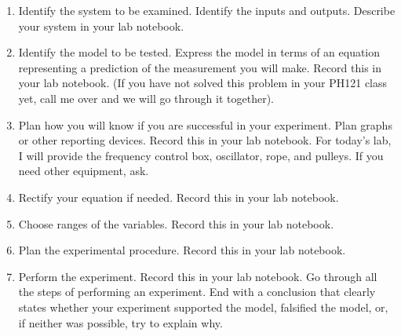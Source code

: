 \documentclass[twoside,11pt,ShortChapTitles]{BYUTextbook}
\begin{document}
\begin{enumerate}
\item Identify the system to be examined. Identify the inputs and
outputs. Describe your system in your lab notebook.

\item Identify the model to be tested. Express the model in terms of
an equation representing a prediction of the measurement you will make. Record
this in your lab notebook. (If you have not solved this problem in your PH121
class yet, call me over and we will go through it together).

\item Plan how you will know if you are successful in your experiment.
Plan graphs or other reporting devices. Record this in your lab notebook. For
today's lab, I will provide the frequency control box, oscillator, rope, and pulleys. If you need
other equipment, ask.

\item Rectify your equation if needed. Record this in your lab
notebook.

\item Choose ranges of the variables. Record this in your lab
notebook.

\item Plan the experimental procedure. Record this in your lab
notebook.

\item Perform the experiment. Record this in your lab notebook. Go
through all the steps of performing an experiment. End with a conclusion that
clearly states whether your experiment supported the model, falsified the
model, or, if neither was possible, try to explain why.
\end{enumerate}
\end{document}
